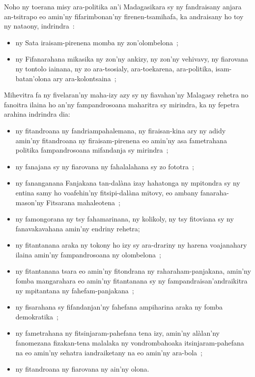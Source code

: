 \documentclass[12pt]{article}
\begin{document}
\noindent
Noho ny toerana misy ara-politika an'i Madagasikara sy ny fandraisany anjara
an-tsitrapo eo amin'ny fifarimbonan'ny firenen-tsamihafa, ka andraisany ho toy
ny nataony, indrindra~:
\begin{itemize}
\item ny Sata iraisam-pirenena momba ny zon'olombelona~;
\item ny Fifanarahana mikasika ny zon'ny ankizy, ny zon'ny vehivavy, ny
  fiarovana ny tontolo iainana, ny zo ara-tsosialy, ara-toekarena, ara-politika,
  isam-batan'olona ary ara-kolontsaina~;
\end{itemize}

\noindent
Mihevitra fa ny fivelaran'ny maha-izy azy sy ny fiavahan'ny Malagasy rehetra no
fanoitra ilaina ho an'ny fampandrosoana maharitra sy mirindra, ka ny fepetra
arahina indrindra dia:
\begin{itemize}
\item ny fitandroana ny fandriampahalemana, ny firaisan-kina ary ny adidy
  amin'ny fitandroana ny firaisam-pirenena eo amin'ny asa fametrahana politika
  fampandrosoana mifandanja sy mirindra~;

\item ny fanajana sy ny fiarovana ny fahalalahana sy zo fototra~;

\item ny fananganana Fanjakana tan-dalàna izay hahatonga ny mpitondra sy ny
  entina samy ho voafehin'ny fitsipi-dalàna mitovy, eo ambany fanaraha-mason'ny
  Fitsarana mahaleotena~;

\item ny famongorana ny tsy fahamarinana, ny kolikoly, ny tsy fitoviana sy ny
  fanavakavahana amin'ny endriny rehetra;

\item ny fitantanana araka ny tokony ho izy sy ara-drariny ny harena voajanahary
  ilaina amin'ny fampandrosoana ny olombelona~;

\item ny fitantanana tsara eo amin'ny fitondrana ny raharaham-panjakana, amin'ny
  fomba mangarahara eo amin'ny fitantanana sy ny fampandraisan'andraikitra ny
  mpitantana ny fahefam-panjakana~;

\item ny fisarahana sy fifandanjan'ny fahefana ampiharina araka ny fomba
  demokratika~;

\item ny fametrahana ny fitsinjaram-pahefana tena izy, amin'ny alàlan'ny
  fanomezana fizakan-tena malalaka ny vondrombahoaka itsinjaram-pahefana na eo
  amin'ny sehatra iandraiketany na eo amin'ny ara-bola~;

\item ny fitandroana ny fiarovana ny ain'ny olona.
\end{itemize}
\end{document}
